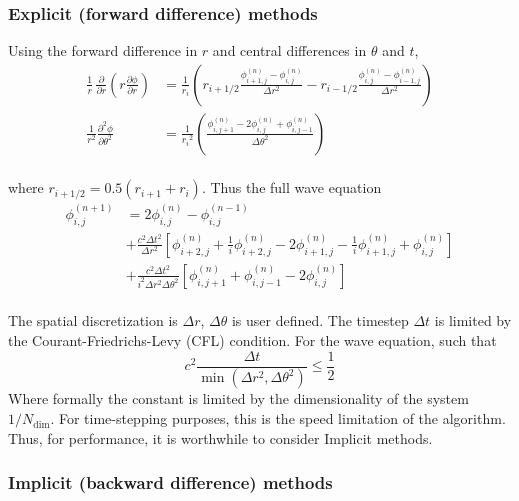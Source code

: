 \documentclass{homework}
\begin{document}
\subsubsection{Explicit (forward difference) methods}

Using the forward difference in $r$ and central differences in $\theta$ and $t$,
\begin{align*}
    \frac{1}{r} \, \frac{\partial}{\partial r}\left(r \frac{\partial \phi}{\partial r} \right) &= \frac{1}{r_i} \left(r_{i+1/2} \frac{\phi^{\left(n\right)}_{i+1,j} - \phi^{\left(n\right)}_{i,j}}{\Delta r^2} - r_{i-1/2} \frac{\phi^{\left(n\right)}_{i,j} - \phi^{\left(n\right)}_{i-1,j}}{\Delta r^2} \right) \\
    \frac{1}{r^2} \frac{\partial^2\phi}{\partial \theta^2} &= \frac{1}{{r_i}^2} \left( \frac{\phi^{\left(n\right)}_{i,j+1} - 2 \phi^{\left(n\right)}_{i,j} + \phi^{\left(n\right)}_{i,j-1}}{{\Delta \theta}^2} \right)
\end{align*}
\\ \noindent
where $r_{i + 1/2}= 0.5 \left(r_{i+1} + r_i \right)$. Thus the full wave equation
\begin{align*}
    \phi_{i,j}^{\left(n+1\right)} &= 2 \phi_{i,j}^{\left(n\right)} - \phi_{i,j}^{\left(n-1\right)} \\
    &+ \frac{c^2 \Delta t^2}{\Delta r^2}\left[\phi_{i+2,j}^{\left(n\right)} + \frac{1}{i}\phi_{i+2,j}^{\left(n\right)} - 2\phi_{i+1,j}^{\left(n\right)} - \frac{1}{i}\phi_{i+1,j}^{\left(n\right)} + \phi_{i,j}^{\left(n\right)}\right] \\
    &+ \frac{c^2 \Delta t^2}{i^2 \Delta r^2 {\Delta \theta}^2} \left[\phi_{i,j+1}^{\left(n\right)} + \phi_{i,j-1}^{\left(n\right)} - 2\phi_{i,j}^{\left(n\right)} \right]
\end{align*}
\\ \noindent
The spatial discretization is $\Delta r$, $\Delta \theta$ is user defined. The timestep $\Delta t$ is limited by the Courant-Friedrichs-Levy (CFL) condition. For the wave equation, such that
$$ c^2 \frac{\Delta t}{\min(\Delta r^2, {\Delta \theta}^2)} \leq \frac{1}{2} $$
Where formally the constant is limited by the dimensionality of the system $ 1 / N_{\textrm{dim}}$. For time-stepping purposes, this is the speed limitation of the algorithm. Thus, for performance, it is worthwhile to consider Implicit methods.

\subsubsection{Implicit (backward difference) methods}
\end{document}

